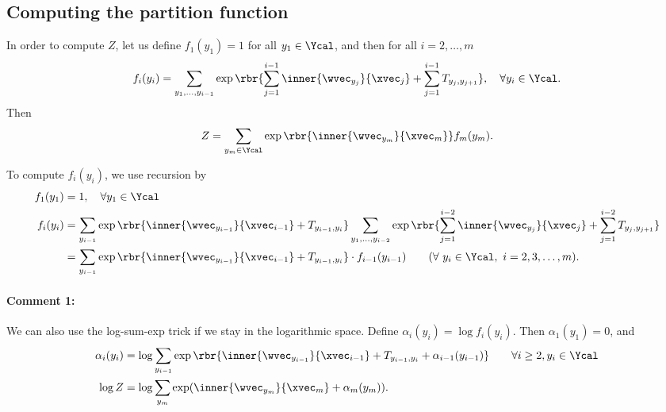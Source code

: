 \documentclass[11pt]{report}
\begin{document}
\subsection{Computing the partition function}
\label{sec:partition}

In order to compute $Z$, let us define $f_1(y_1) = 1$ for all $y_1 \in \Ycal$, and then for all $i = 2, \ldots, m$
\begin{align}
	f_i(y_i) = \sum_{y_1, \ldots, y_{i-1}} \exp \rbr{\sum_{j=1}^{i-1} \inner{\wvec_{y_j}}{\xvec_j} + \sum_{j=1}^{i-1} T_{y_j, y_{j+1}}}, \quad \forall y_i \in \Ycal.
\end{align}
Then
\begin{align}
	Z = \sum_{y_m \in \Ycal} \exp \rbr{\inner{\wvec_{y_m}}{\xvec_m}} f_m(y_m) .
\end{align}

To compute $f_i(y_i)$, we use recursion by
\begin{align}
	\label{eq:rec_Z_forward_1}
	f_1(y_1) &= 1, \quad \forall y_1 \in \Ycal \\
	f_i(y_i) &= \sum_{y_{i-1}} \exp \rbr{\inner{\wvec_{y_{i-1}}}{\xvec_{i-1}} + T_{y_{i-1}, y_i}}
	\sum_{y_1, \ldots, y_{i-2}} \exp \rbr{\sum_{j=1}^{i-2} \inner{\wvec_{y_j}}{\xvec_j} + \sum_{j=1}^{i-2} T_{y_j, y_{j+1}}} \\
	\label{eq:rec_Z_forward_2}
	&= \sum_{y_{i-1}} \exp \rbr{\inner{\wvec_{y_{i-1}}}{\xvec_{i-1}} + T_{y_{i-1}, y_i}}  \cdot f_{i-1}(y_{i-1})  \qquad (\forall\ y_i \in \Ycal, \ i = 2, 3, \ldots, m).	 
\end{align}

\paragraph{Comment 1:}
We can also use the log-sum-exp trick if we stay in the logarithmic space. 
Define $\alpha_i(y_i) = \log f_i(y_i)$.
Then $\alpha_1(y_1) = 0$, and
\begin{align}
	\alpha_i(y_i) &= \log \sum_{y_{i-1}} \exp \rbr{\inner{\wvec_{y_{i-1}}}{\xvec_{i-1}} + T_{y_{i-1}, y_i} + \alpha_{i-1}(y_{i-1})} \qquad \forall i \ge 2, y_i \in \Ycal\\
	\log Z &= \log \sum_{y_m} \exp (\inner{\wvec_{y_m}}{\xvec_m} + \alpha_m(y_m)).
\end{align}
\end{document}
